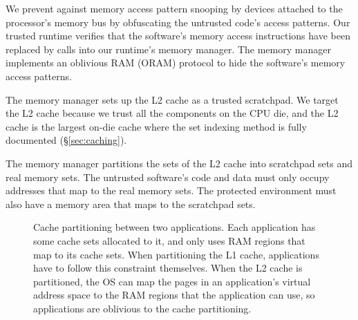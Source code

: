 We prevent against memory access pattern snooping by devices attached to the
processor's memory bus by obfuscating the untrusted code's access patterns. Our
trusted runtime verifies that the software's memory access instructions have
been replaced by calls into our runtime's memory manager. The memory manager
implements an oblivious RAM (ORAM) protocol \cite{stefanov2013path} to hide the
software's memory access patterns.

The memory manager sets up the L2 cache as a trusted scratchpad. We target the
L2 cache because we trust all the components on the CPU die, and the L2 cache
is the largest on-die cache where the set indexing method is fully documented
(\S \ref{sec:caching}).

The memory manager partitions the sets of the L2 cache into scratchpad sets and
real memory sets. The untrusted software's code and data must only occupy
addresses that map to the real memory sets. The protected environment must also
have a memory area that maps to the scratchpad sets.

\begin{figure}[hbtp]
  \caption{
    Cache partitioning between two applications. Each application has some
    cache sets allocated to it, and only uses RAM regions that map to its cache
    sets. When partitioning the L1 cache, applications have to follow this
    constraint themselves. When the L2 cache is partitioned, the OS can map the
    pages in an application's virtual address space to the RAM regions that the
    application can use, so applications are oblivious to the cache
    partitioning.
  }
  \label{fig:cache_partitions}
\end{figure}

